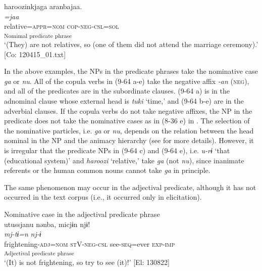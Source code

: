 \ex %
\gllll   haroozinkjaga  aranbajaa.\\
      \textit{}  \textit{=jaa}\\
      relative=\textsc{appr}=\textsc{nom}  \textsc{cop}-\textsc{neg}-\textsc{csl}=\textsc{sol}\\
      [NP  Copula verb]\textsubscript{Nomimal predicate phrase}\\
      \glt       ‘(They) are not relatives, so (one of them did not attend the marriage ceremony).’ [Co: 120415\_01.txt]
    \z
\z

In the above examples, the NPs in the predicate phrases take the nominative case \textit{ga} or \textit{nu}. All of the copula verbs in (9-64 a-e) take the negative affix \textit{{}-an} (\textsc{neg}), and all of the predicates are in the subordinate clauses. (9-64 a) is in the adnominal clause whose external head is \textit{tuki} ‘time,’ and (9-64 b-e) are in the adverbial clauses. If the copula verbs do not take negative affixes, the NP in the predicate does not take the nominative cases as in (8-36 e) in . The selection of the nominative particles, i.e. \textit{ga} or \textit{nu}, depends on the relation between the head nominal in the NP and the animacy hierarchy (see  for more details). However, it is irregular that the predicate NPs in (9-64 c) and (9-64 e), i.e. \textit{u-rɨ} ‘that (educational system)’ and \textit{haroozi} ‘relative,’ take \textit{ga} (not \textit{nu}), since inanimate referents or the human common nouns cannot take \textit{ga} in principle.

  The same phenomenon may occur in the adjectival predicate, although it has not occurred in the text corpus (i.e., it occurred only in elicitation).

\ea
Nominative case in the adjectival predicate phrase \label{ex:9.65}\\
 \gllll  utussjanu  nənba,  micjɨn  njɨ!\\
    \textit{}  \textit{}  \textit{mj-tɨ=n}  \textit{nj-ɨ}\\
    frightening-\textsc{adj}=\textsc{nom}  \textsc{st}V-\textsc{neg}-\textsc{csl}  see-\textsc{seq}=ever  \textsc{exp}-\textsc{imp}\\
    [Adjective  Stative verb]\textsubscript{Adjectival predicate phrase}    \\
    \glt     ‘(It) is not frightening, so try to see (it)!’ [El: 130822]
\z

